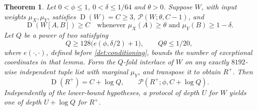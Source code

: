 \documentclass[11pt,letterpaper]{article} \usepackage[utf8]{inputenc}
\theoremstyle{plain} \newtheorem{theorem}{Theorem}[section]
\theoremstyle{definition} \newaliascnt{definition}{theorem}
\newcommand{\D}{\operatorname{D}}
\newcommand{\RP}[3]{\mathcal{P}(#1;#2,#3)}
\begin{document}
\begin{theorem}\label{det:restore}
Let $0<\phi\le1$, $0<\delta\le1/64$ and $\theta>0$. Suppose $W$, with input weights
$\mu_X,\mu_Y$, satisfies $\D(W)=C\ge3$, $\RP{W}{\theta}{C-1}$, and
\[
\D(W[A,B])\ge C \quad\text{whenever }\mu_X(A)\ge\theta
\text{ and }\mu_Y(B)\ge1-\delta.
\]
Let $Q$ be a power of two satisfying
\[
Q\ge128\bigl(e(\phi,\delta/2)+1\bigr), \qquad Q\theta\le1/20,
\]
where $e(\cdot,\cdot)$, defined before \cref{det:conditioning}, bounds the
number of exceptional coordinates in that lemma.
Form the $Q$-fold interlace of $W$ on any exactly $8192$-wise independent tuple list with
marginal $\mu_Y$, and transpose it to obtain $R^+$. Then
\[
\D(R^+)=C+\log Q, \qquad \RP{R^+}{\phi}{C+\log Q}.
\]
Independently of the lower-bound hypotheses, a protocol of depth $U$ for $W$
yields one of depth $U+\log Q$ for $R^+$.
\end{theorem}
\end{document}
